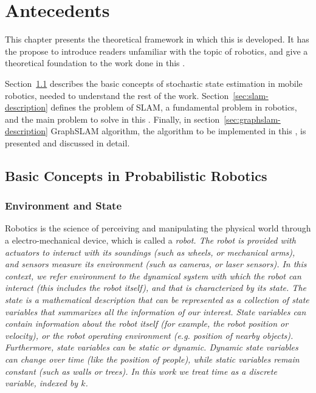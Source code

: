 \chapter{Antecedents}
\label{chap:antecedents}

This chapter presents the theoretical framework in which this \mem{} is developed. It has the propose to introduce readers unfamiliar with the topic of robotics, and give a theoretical foundation to the work done in this \mem.

Section~\ref{sec:basic-concepts} describes the basic concepts of stochastic state estimation in mobile robotics, needed to understand the rest of the work. Section~\ref{sec:slam-description} defines the problem of SLAM, a fundamental problem in robotics, and the main problem to solve in this \mem. Finally, in section~\ref{sec:graphslam-description} GraphSLAM algorithm, the algorithm to be implemented in this \mem{}, is presented and discussed in detail. 

\section{Basic Concepts in Probabilistic Robotics} 
\label{sec:basic-concepts}

\subsection{Environment and State}

Robotics is the science of perceiving and manipulating the physical world through a electro-mechanical device, which is called a \it{robot}. The robot is provided with actuators to interact with its soundings (such as wheels, or mechanical arms), and sensors measure its environment (such as cameras, or laser sensors). In this context, we refer \it{environment} to the dynamical system with which the robot can interact (this includes the robot itself), and that is characterized by its \it{state}. The state is a mathematical description that can be represented as a collection of \it{state variables} that summarizes all the information of our interest. State variables can contain information about the robot itself (for example, the robot position or velocity), or the robot operating environment (e.g. position of nearby objects). Furthermore, state variables can be \it{static} or \it{dynamic}. Dynamic state variables can change over time (like the position of people), while static variables remain constant (such as walls or trees). In this work we treat time as a discrete variable, indexed by $k$.

